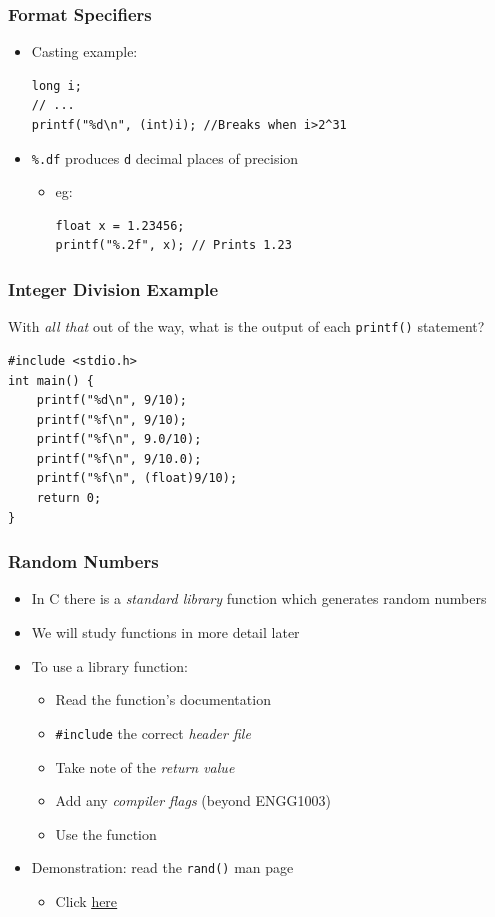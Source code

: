 \documentclass[14pt]{beamer}
\begin{document}
\begin{frame}[fragile]
\frametitle{Format Specifiers}
\begin{itemize}
\item Casting example:
\begin{lstlisting}[style=CStyle]
long i;
// ...
printf("%d\n", (int)i); //Breaks when i>2^31
\end{lstlisting}
\item \texttt{\%.df} produces \texttt{d} decimal places of precision
	\begin{itemize}
		\item eg: \\
		\begin{lstlisting}[style=CStyle]
float x = 1.23456;
printf("%.2f", x); // Prints 1.23
\end{lstlisting}
	\end{itemize}
\end{itemize}
\end{frame}


\begin{frame}[fragile]
\frametitle{Integer Division Example}
With \textit{all that} out of the way, what is the output of each \texttt{printf()} statement?
\begin{lstlisting}[style=CStyle]
#include <stdio.h>
int main() {
	printf("%d\n", 9/10);
	printf("%f\n", 9/10);
	printf("%f\n", 9.0/10);
	printf("%f\n", 9/10.0);
	printf("%f\n", (float)9/10);
	return 0;
}
\end{lstlisting}
\end{frame}

\begin{frame}[fragile]
\frametitle{Random Numbers}
\begin{itemize}
\item In C there is a \textit{standard library} function which generates random numbers
\item We will study functions in more detail later
\item To use a library function:
	\begin{itemize}
		\item Read the function's documentation
		\item \texttt{\#include} the correct \textit{header file}
		\item Take note of the \textit{return value}
		\item Add any \textit{compiler flags} (beyond ENGG1003)
		\item Use the function
	\end{itemize}
\item Demonstration: read the \texttt{rand()} man page
	\begin{itemize}
		\item Click \underline{\href{http://man7.org/linux/man-pages/man3/rand.3.html}{here}}
	\end{itemize}
\end{itemize}
\end{frame}
\end{document}
